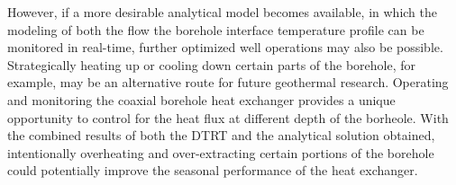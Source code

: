 	However, if a more desirable analytical model becomes available, in which the modeling of both the flow the borehole interface temperature profile can be monitored in real-time, further optimized well operations may also be possible. Strategically heating up or cooling down certain parts of the borehole, for example, may be an alternative route for future geothermal research. Operating and monitoring the coaxial borehole heat exchanger provides a unique opportunity to control for the heat flux at different depth of the borheole. With the combined results of both the DTRT and the analytical solution obtained, intentionally overheating and over-extracting certain portions of the borehole could potentially improve the seasonal performance of the heat exchanger. 
	
